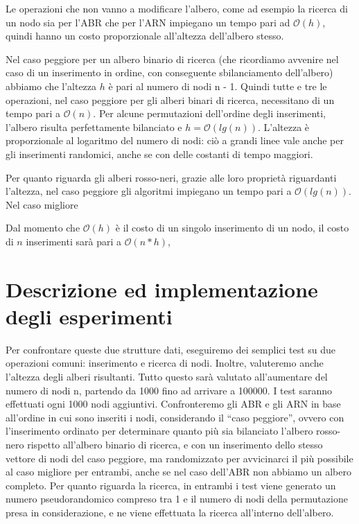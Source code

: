 \documentclass[
]{article}
\begin{document}
Le operazioni che non vanno a modificare l'albero, come ad esempio la
ricerca di un nodo sia per l'ABR che per l'ARN impiegano un tempo pari
ad \(\mathcal{O}(h)\), quindi hanno un costo proporzionale all'altezza
dell'albero stesso.

Nel caso peggiore per un albero binario di ricerca (che ricordiamo
avvenire nel caso di un inserimento in ordine, con conseguente
sbilanciamento dell'albero) abbiamo che l'altezza \(h\) è pari al numero
di nodi n - 1. Quindi tutte e tre le operazioni, nel caso peggiore per
gli alberi binari di ricerca, necessitano di un tempo pari a
\(\mathcal{O}(n)\). Per alcune permutazioni dell'ordine degli
inserimenti, l'albero risulta perfettamente bilanciato e
\(h = \mathcal{O}(lg(n))\). L'altezza è proporzionale al logaritmo del
numero di nodi: ciò a grandi linee vale anche per gli inserimenti
randomici, anche se con delle costanti di tempo maggiori.

Per quanto riguarda gli alberi rosso-neri, grazie alle loro proprietà
riguardanti l'altezza, nel caso peggiore gli algoritmi impiegano un
tempo pari a \(\mathcal{O}(lg(n))\). Nel caso migliore

Dal momento che \(\mathcal{O}(h)\) è il costo di un singolo inserimento
di un nodo, il costo di \(n\) inserimenti sarà pari a
\(\mathcal{O}(n*h)\),

\hypertarget{descrizione-ed-implementazione-degli-esperimenti}{%
\section{Descrizione ed implementazione degli
esperimenti}\label{descrizione-ed-implementazione-degli-esperimenti}}

Per confrontare queste due strutture dati, eseguiremo dei semplici test
su due operazioni comuni: inserimento e ricerca di nodi. Inoltre,
valuteremo anche l'altezza degli alberi risultanti. Tutto questo sarà
valutato all'aumentare del numero di nodi n, partendo da 1000 fino ad
arrivare a 100000. I test saranno effettuati ogni 1000 nodi aggiuntivi.
Confronteremo gli ABR e gli ARN in base all'ordine in cui sono inseriti
i nodi, considerando il ``caso peggiore'', ovvero con l'inserimento
ordinato per determinare quanto più sia bilanciato l'albero rosso-nero
rispetto all'albero binario di ricerca, e con un inserimento dello
stesso vettore di nodi del caso peggiore, ma randomizzato per
avvicinarci il più possibile al caso migliore per entrambi, anche se nel
caso dell'ABR non abbiamo un albero completo. Per quanto riguarda la
ricerca, in entrambi i test viene generato un numero pseudorandomico
compreso tra 1 e il numero di nodi della permutazione presa in
considerazione, e ne viene effettuata la ricerca all'interno
dell'albero.
\end{document}
